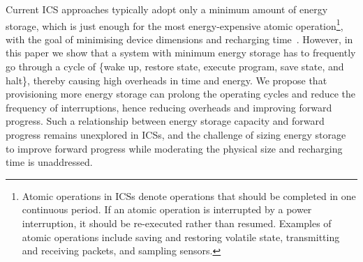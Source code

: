 Current ICS approaches typically adopt only a minimum amount of energy storage, which is just enough for the most energy-expensive atomic operation\footnote{Atomic operations in ICSs denote operations that should be completed in one continuous period. If an atomic operation is interrupted by a power interruption, it should be re-executed rather than resumed. Examples of atomic operations include saving and restoring volatile state, transmitting and receiving packets, and sampling sensors. }, with the goal of minimising device dimensions and recharging time~\cite{6960060, 6733152, 10.1145/2809695.2809707, 10.1145/3281300, 222579}. 
However, in this paper we show that a system with minimum energy storage has to frequently go through a cycle of \{wake up, restore state, execute program, save state, and halt\}, thereby causing high overheads in time and energy. We propose that provisioning more energy storage can prolong the operating cycles and reduce the frequency of interruptions, hence reducing overheads and improving forward progress. 
Such a relationship between energy storage capacity and forward progress remains unexplored in ICSs, and the challenge of sizing energy storage to improve forward progress while moderating the physical size and recharging time is unaddressed. 

